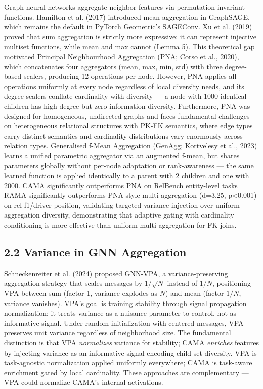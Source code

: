 \documentclass[final]{article}
\begin{document}
Graph neural networks aggregate neighbor features via permutation-invariant functions. Hamilton et al. (2017) introduced mean aggregation in GraphSAGE, which remains the default in PyTorch Geometric's SAGEConv. Xu et al. (2019) proved that sum aggregation is strictly more expressive: it can represent injective multiset functions, while mean and max cannot (Lemma 5). This theoretical gap motivated Principal Neighbourhood Aggregation (PNA; Corso et al., 2020), which concatenates four aggregators (mean, max, min, std) with three degree-based scalers, producing 12 operations per node. However, PNA applies all operations uniformly at every node regardless of local diversity needs, and its degree scalers conflate cardinality with diversity --- a node with 1000 identical children has high degree but zero information diversity. Furthermore, PNA was designed for homogeneous, undirected graphs and faces fundamental challenges on heterogeneous relational structures with PK-FK semantics, where edge types carry distinct semantics and cardinality distributions vary enormously across relation types. Generalised f-Mean Aggregation (GenAgg; Kortvelesy et al., 2023) learns a unified parametric aggregator via an augmented f-mean, but shares parameters globally without per-node adaptation or rank-awareness --- the same learned function is applied identically to a parent with 2 children and one with 2000. CAMA significantly outperforms PNA on RelBench entity-level tasks RAMA significantly outperforms PNA-style multi-aggregation (d=3.25, p<0.001) on rel-f1/driver-position, validating targeted variance injection over uniform aggregation diversity, demonstrating that adaptive gating with cardinality conditioning is more effective than uniform multi-aggregation for FK joins.

\subsection{2.2 Variance in GNN Aggregation}

Schneckenreiter et al. (2024) proposed GNN-VPA, a variance-preserving aggregation strategy that scales messages by $1/\sqrt{N}$ instead of $1/N$, positioning VPA between sum (factor 1, variance explodes as $N$) and mean (factor $1/N$, variance vanishes). VPA's goal is training stability through signal propagation normalization: it treats variance as a nuisance parameter to control, not as informative signal. Under random initialization with centered messages, VPA preserves unit variance regardless of neighborhood size. The fundamental distinction is that VPA \textit{normalizes} variance for stability; CAMA \textit{enriches} features by injecting variance as an informative signal encoding child-set diversity. VPA is task-agnostic normalization applied uniformly everywhere; CAMA is task-aware enrichment gated by local cardinality. These approaches are complementary --- VPA could normalize CAMA's internal activations.
\end{document}
